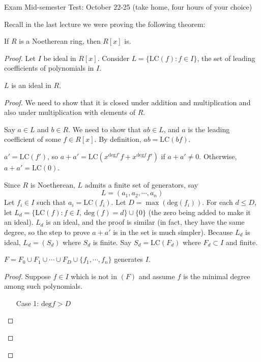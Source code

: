 \documentclass[a4paper,twoside,master.tex]{subfiles}
\begin{document}

\begin{note}{Exam}
    Mid-semester Test: October 22-25 (take home, four hours of your choice)
\end{note}

Recall in the last lecture we were proving the following theorem:
\begin{theorem}
    If $ R $ is a Noetherean ring, then $ R[x] $ is.
\end{theorem}

\begin{proof}
    Let $ I $ be ideal in $ R[x] $. Consider $ L = \{\text{LC}(f)\colon f \in I\} $, the set of leading coefficients of polynomials in $ I $.
    \begin{claim}
        $ L $ is an ideal in $ R $.
    \end{claim}
    \begin{proof}
        We need to show that it is closed under addition and multiplication and also under multiplication with elements of $ R $.

        Say $ a \in L $ and $ b \in R $. We need to show that $ a b \in L $, and $ a $ is the leading coefficient of some $ f \in R[x] $. By definition, $ a b = \text{LC}(b f) $.
        
        $ a' = \text{LC}(f') $, so $ a + a' = \text{LC} \left( x^{\text{deg} f'}f + x^{\text{deg} f} f' \right) $ if $ a + a' \neq 0 $. Otherwise, $ a + a' = \text{LC}(0) $.

        Since $ R $ is Noetherean, $ L $ admits a finite set of generators, say
        \begin{equation}
            L = (a_1, a_2, \cdots, a_n)
        \end{equation}
        Let $ f_i \in I $ such that $ a_i = \text{LC}(f_i) $. Let $ D = \max(\text{deg}(f_i)) $. For each $ d \leq D $, let $ L_d = \{\text{LC}(f) \colon f \in I,\ \text{deg}(f) = d\} \cup \{0\} $ (the zero being added to make it an ideal). $ L_d $ is an ideal, and the proof is similar (in fact, they have the same degree, so the step to prove $ a + a' $ is in the set is much simpler). Because $ L_d $ is ideal, $ L_d = (S_d) $ where $ S_d $ is finite. Say $ S_d = \text{LC}(F_d) $ where $ F_d \subset I $ and finite.
        \begin{claim}
            $ F = F_0 \cup F_1 \cup \cdots \cup F_D \cup \{f_1, \cdots, f_n\} $ generates $ I $.
        \end{claim}
        \begin{proof}
            Suppose $ f \in I $ which is not in $ (F) $ and assume $ f $ is the minimal degree among such polynomials.
            \begin{itemize}
                \item[Case 1:] $ \text{deg} f > D $


\end{itemize}
\end{proof}
\end{proof}
\end{proof}
\end{document}
